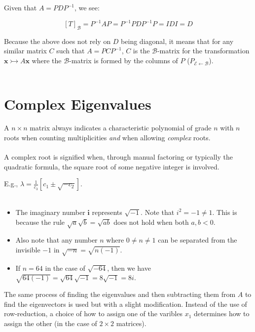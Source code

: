 \documentclass[12pt]{article}
\newcommand{\bm}[1]{\mathbf{{#1}}}
\newcommand{\mmc}[1]{\mathcal{{#1}}}
\begin{document}
Given that $A = PDP^{-1}$, we see:

$$[T]_\mmc{B} = P^{-1}AP = P^{-1}PDP^{-1}P = IDI = D$$

Because the above does not rely on $D$ being diagonal, it means that for
any similar matrix $C$ such that $A = PCP^{-1}$, $C$ is the $\mmc{B}$-matrix
for the transformation $\bm{x} \rightarrowtail A\bm{x}$ where the $\mmc{B}$-matrix is formed
by the columns of $P$ ($P_{\mmc{E \leftarrow B}}$). \\ \\

\section*{Complex Eigenvalues}

A $n \times n$ matrix always indicates a characteristic polynomial of grade $n$ with $n$ roots
when counting multiplicities \emph{and} when allowing \emph{complex} roots. \\ \\

A complex root is signified when, through manual factoring or typically the quadratic formula,
the square root of some negative integer is involved.

E.g., $\lambda = \frac{1}{c_3}[c_1 \pm \sqrt{-c_2}]$. \\ \\


\begin{itemize}
    \item The imaginary number $\bm{i}$ represents $\sqrt{-1}$. Note that $i^2 = -1 \neq 1$. This is because the rule $\sqrt{a}\sqrt{b} = \sqrt{ab}$ does not hold when both $a, b < 0$.
    \item Also note that any number $n$ where $0 \neq n \neq 1$ can be separated from the invisible $-1$ in $\sqrt{-n} = \sqrt{n(-1)}$.
    \item If $n = 64$ in the case of $\sqrt{-64}$, then we have $\sqrt{64(-1)} = \sqrt{64}\sqrt{-1} = 8\sqrt{-1} = 8i$.
\end{itemize}

The same process of finding the eigenvalues and then subtracting them from
$A$ to find the eigenvectors is used but with a slight modification. Instead of
the use of row-reduction, a choice of how to assign one of the varibles $x_1$ determines
how to assign the other (in the case of $2 \times 2$ matrices). \\ \\
\end{document}
